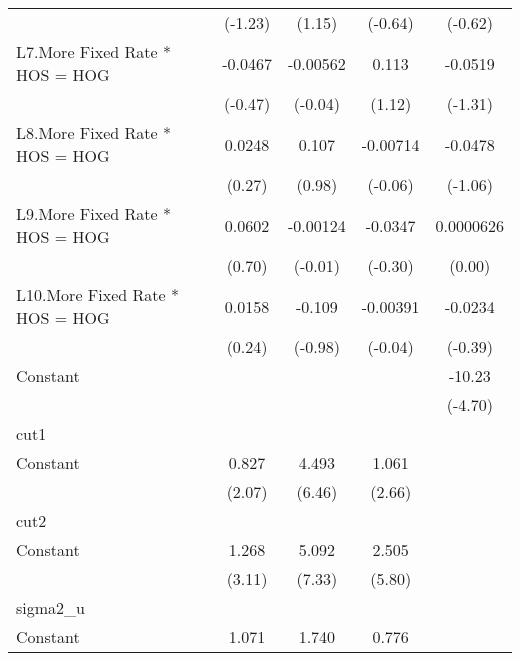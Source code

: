 {\begin{longtable}{l*{4}{c}}
                &  (-1.23)         &   (1.15)         &  (-0.64)         &  (-0.62)         \\
\addlinespace
L7.More Fixed Rate * HOS = HOG&  -0.0467         & -0.00562         &    0.113         &  -0.0519         \\
                &  (-0.47)         &  (-0.04)         &   (1.12)         &  (-1.31)         \\
\addlinespace
L8.More Fixed Rate * HOS = HOG&   0.0248         &    0.107         & -0.00714         &  -0.0478         \\
                &   (0.27)         &   (0.98)         &  (-0.06)         &  (-1.06)         \\
\addlinespace
L9.More Fixed Rate * HOS = HOG&   0.0602         & -0.00124         &  -0.0347         &0.0000626         \\
                &   (0.70)         &  (-0.01)         &  (-0.30)         &   (0.00)         \\
\addlinespace
L10.More Fixed Rate * HOS = HOG&   0.0158         &   -0.109         & -0.00391         &  -0.0234         \\
                &   (0.24)         &  (-0.98)         &  (-0.04)         &  (-0.39)         \\
\addlinespace
Constant        &                  &                  &                  &   -10.23\sym{***}\\
                &                  &                  &                  &  (-4.70)         \\
\midrule
cut1            &                  &                  &                  &                  \\
Constant        &    0.827\sym{*}  &    4.493\sym{***}&    1.061\sym{**} &                  \\
                &   (2.07)         &   (6.46)         &   (2.66)         &                  \\
\midrule
cut2            &                  &                  &                  &                  \\
Constant        &    1.268\sym{**} &    5.092\sym{***}&    2.505\sym{***}&                  \\
                &   (3.11)         &   (7.33)         &   (5.80)         &                  \\
\midrule
sigma2\_u        &                  &                  &                  &                  \\
Constant        &    1.071\sym{***}&    1.740\sym{***}&    0.776\sym{**} &                  \\

\end{longtable}}
